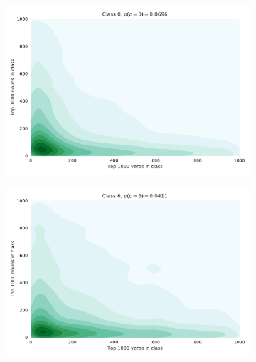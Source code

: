 \documentclass[11pt]{scrartcl}
\begin{document}
\begin{figure}

  \begin{subfigure}[b]{0.5\textwidth}
    \includegraphics[width=\textwidth]{class_0.pdf}
  \end{subfigure}
  \begin{subfigure}[b]{0.5\textwidth}
    \includegraphics[width=\textwidth]{class_6.pdf}
  \end{subfigure}


\end{figure}
\end{document}
